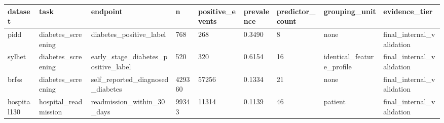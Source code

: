 \begin{tabular}{lllllllll}
\hline
dataset & task & endpoint & n & positive\_events & prevalence & predictor\_count & grouping\_unit & evidence\_tier \\
\hline
pidd & diabetes\_screening & diabetes\_positive\_label & 768 & 268 & 0.3490 & 8 & none & final\_internal\_validation \\
sylhet & diabetes\_screening & early\_stage\_diabetes\_positive\_label & 520 & 320 & 0.6154 & 16 & identical\_feature\_profile & final\_internal\_validation \\
brfss & diabetes\_screening & self\_reported\_diagnosed\_diabetes & 429360 & 57256 & 0.1334 & 21 & none & final\_internal\_validation \\
hospital130 & hospital\_readmission & readmission\_within\_30\_days & 99343 & 11314 & 0.1139 & 46 & patient & final\_internal\_validation \\
\hline
\end{tabular}
